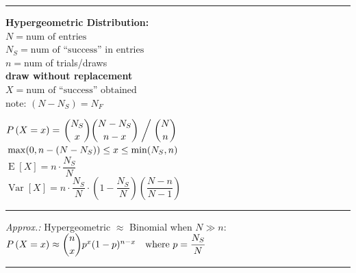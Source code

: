 \documentclass[11pt, a4paper]{article}
\newcommand{\myP}[1]{P\left(#1\right)}
\newcommand{\myPMF}[2][X]{\myP{#1 = #2}}
\newcommand{\myExpect}[1]{\operatorname{E}\left[#1\right]}
\newcommand{\myVariance}[1]{\operatorname{Var}\left[#1\right]}
\begin{document}
\vspace{5pt}
{\color{black!30}\hrule}


\noindent
{
    \newcommand{\myNumsEntries}{N}
    \newcommand{\myNumsSuccess}{N_S}
    \newcommand{\myNumsFailure}{N_F}

    \begin{minipage}[t]{0.37\textwidth}
        \textbf{Hypergeometric Distribution:} \\[2pt]
        $\myNumsEntries = \text{num of entries}$ \\
        $\myNumsSuccess = \text{num of ``success'' in entries}$ \\
        $n = {}$num of trials/draws \\
        \textbf{draw without replacement} \\
        $X = \text{num of ``success'' obtained}$
        \vspace{3pt} \\
        note: $(\myNumsEntries - \myNumsSuccess) = \myNumsFailure$
    \end{minipage}%
    \hfill
    \begin{minipage}[t]{0.60\textwidth}
        $\myPMF{x} = \left. \dbinom{\myNumsSuccess}{x}\dbinom{\myNumsEntries - \myNumsSuccess}{n-x} \; \middle/ \; \dbinom{\myNumsEntries}{n} \right. $ \\[1ex]
        ${} \hfill \max(0, n-(\myNumsEntries-\myNumsSuccess)) \le x \le \min(\myNumsSuccess, n)$ \\
        $\myExpect{X} = n \cdot \dfrac{\myNumsSuccess}{\myNumsEntries}$ \\[2pt]
        $\myVariance{X} = n \cdot \dfrac{\myNumsSuccess}{\myNumsEntries} \cdot \left(1 - \dfrac{\myNumsSuccess}{\myNumsEntries}\right)\left(\dfrac{\myNumsEntries-n}{\myNumsEntries-1}\right)$ \\
        {\color{black!30}\hrule} \vspace{5pt}
        \textit{Approx.:} Hypergeometric $\approx$ Binomial when $\myNumsEntries \gg n$: \\
        $\myPMF{x} \approx \dbinom{n}{x} p^x (1-p)^{n-x} \quad \text{where } p = \dfrac{\myNumsSuccess}{\myNumsEntries}$
    \end{minipage}

}

\vspace{5pt}
{\color{black!30}\hrule}
\end{document}
